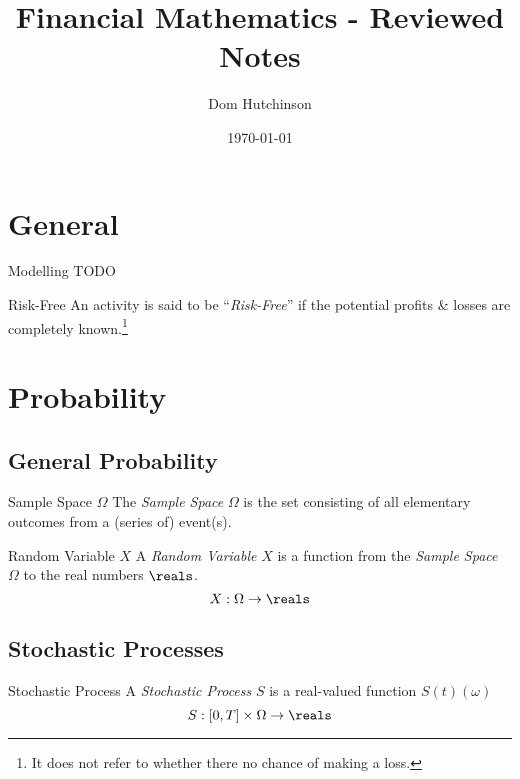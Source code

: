 \documentclass[11pt,a4paper]{article}
\begin{document}
\title{Financial Mathematics - Reviewed Notes}
\author{Dom Hutchinson}
\date{\today}
\maketitle

\tableofcontents\newpage

\section{General}\label{sec_general}

  \begin{definition}{Modelling}
    TODO
  \end{definition}

  \begin{definition}{Risk-Free}
    An activity is said to be ``\textit{Risk-Free}'' if the potential profits \& losses are completely known.\footnote{It does not refer to whether there no chance of making a loss.}
  \end{definition}

\section{Probability}\label{sec_probability}

\subsection{General Probability}

  \begin{definition}{Sample Space $\Omega$}
    The \textit{Sample Space} $\Omega$ is the set consisting of all elementary outcomes from a (series of) event(s).
  \end{definition}

  \begin{definition}{Random Variable $X$}
    A \textit{Random Variable} $X$ is a function from the \textit{Sample Space} $\Omega$ to the real numbers $\reals$.
    \[ X:\Omega\to\reals \]
  \end{definition}

\subsection{Stochastic Processes}

  \begin{definition}{Stochastic Process}
    A \textit{Stochastic Process} $S$ is a real-valued function $S(t)(\omega)$
    \[ S:[0,T]\times\Omega\to\reals \]
  \end{definition}
\end{document}
